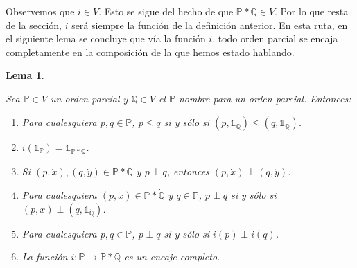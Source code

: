 \documentclass[11pt]{unam_tesis1}
\theoremstyle{MyThmStyle}
\theoremstyle{definition}
\theoremstyle{plain}
\newtheorem{lemma}[definition]{Lema}
\theoremstyle{remark}
\let\leq\leqslant
\begin{document}
Observemos que $i\in V$. Esto se sigue del hecho de que $\mathbb P*\dot{\mathbb Q}\in V$. Por lo que resta de la secci\'on, $i$ ser\'a siempre la funci\'on de la definici\'on anterior. En esta ruta, en el siguiente lema se concluye que v\'ia la funci\'on $i$, todo orden parcial se encaja completamente en la composici\'on de la que hemos estado hablando.

\begin{lemma}\label{encajeiteracion}

Sea $\mathbb P\in V$ un orden parcial y $\dot{\mathbb Q}\in V$ el $\mathbb P$-nombre para un orden parcial. Entonces:
 
\begin{enumerate}

\item Para cualesquiera $p,q\in \mathbb P$, $p\leq q$ si y s\'olo si $(p,\mathds 1_{\dot{\mathbb Q}})\leq (q,\mathds 1_{\dot{\mathbb Q}})$.
\item $i(\mathds{1}_{\mathbb P})=\mathds{1}_{\mathbb P*\dot{\mathbb Q}}$.
\item Si $(p,\dot{x}), (q,\dot y)\in \mathbb P*\dot{\mathbb Q}$ y $p\perp q$, entonces $(p,\dot{x})\perp (q,\dot y)$.
\item Para cualesquiera $(p,\dot{x})\in \mathbb P*\dot{\mathbb Q}$ y $q\in \mathbb P$, $p\perp q$ si y s\'olo si $(p,\dot{x})\perp (q,\mathds 1_{\dot{\mathbb Q}})$.
\item Para cualesquiera $p,q\in \mathbb P$, $p\perp q$ si y s\'olo si $i(p)\perp i(q)$.
\item La funci\'on $i: \mathbb P\to \mathbb P*\dot{\mathbb Q}$ es un encaje completo.

\end{enumerate}

\end{lemma}
\end{document}
